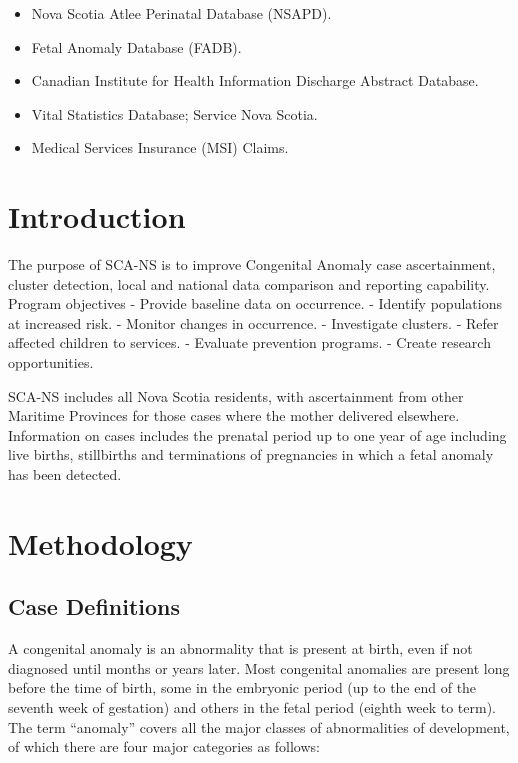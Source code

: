 \documentclass[
]{krantz}
\providecommand{\tightlist}{%
  \setlength{\itemsep}{0pt}\setlength{\parskip}{0pt}}
\begin{document}
\begin{itemize}
\tightlist
\item
  Nova Scotia Atlee Perinatal Database (NSAPD).
\item
  Fetal Anomaly Database (FADB).
\item
  Canadian Institute for Health Information Discharge Abstract Database.
\item
  Vital Statistics Database; Service Nova Scotia.
\item
  Medical Services Insurance (MSI) Claims.
\end{itemize}

\hypertarget{introduction}{%
\chapter*{Introduction}\label{introduction}}


The purpose of SCA-NS is to improve Congenital Anomaly case ascertainment, cluster detection, local and national data comparison and reporting capability. Program objectives
- Provide baseline data on occurrence.
- Identify populations at increased risk.
- Monitor changes in occurrence.
- Investigate clusters.
- Refer affected children to services.
- Evaluate prevention programs.
- Create research opportunities.

SCA-NS includes all Nova Scotia residents, with ascertainment from other Maritime Provinces for those cases where the mother delivered elsewhere. Information on cases includes the prenatal period up to one year of age including live births, stillbirths and terminations of pregnancies in which a fetal anomaly has been detected.

\mainmatter

\hypertarget{chapter1}{%
\chapter{Methodology}\label{chapter1}}

\hypertarget{section11}{%
\section{Case Definitions}\label{section11}}

A congenital anomaly is an abnormality that is present at birth, even if not diagnosed until months or years later. Most congenital anomalies are present long before the time of birth, some in the embryonic period (up to the end of the seventh week of gestation) and others in the fetal period (eighth week to term). The term ``anomaly'' covers all the major classes of abnormalities of development, of which there are four major categories as follows:
\end{document}
